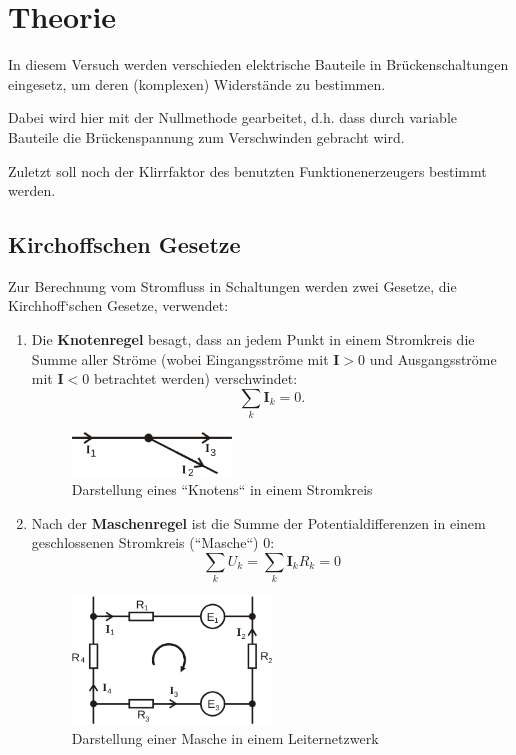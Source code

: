 \section{Theorie}
\label{sec:Theorie}

In diesem Versuch werden verschieden elektrische Bauteile in Brückenschaltungen
eingesetz, um deren (komplexen) Widerstände zu bestimmen.

Dabei wird hier mit der Nullmethode gearbeitet, d.h. dass durch variable Bauteile
die Brückenspannung zum Verschwinden gebracht wird.

Zuletzt soll noch der Klirrfaktor des benutzten Funktionenerzeugers bestimmt werden.

\subsection{Kirchoffschen Gesetze}
\label{sec:kirchhoff}
Zur Berechnung vom Stromfluss in Schaltungen werden zwei Gesetze, die
Kirchhoff`schen Gesetze, verwendet:
\begin{enumerate}
	\item Die \textbf{Knotenregel} besagt, dass an jedem Punkt in einem Stromkreis
		die Summe aller Ströme (wobei Eingangsströme mit $\mathbf{I} > 0$ und
		Ausgangsströme mit $\mathbf{I} < 0$ betrachtet werden) verschwindet:
		\begin{equation}
			\sum_k \mathbf{I}_k = 0.
			\label{eqn:knotenregel}
		\end{equation}
		\begin{figure}[H]
			\centering
			\includegraphics[width=0.4\textwidth]{bilder/knotenregel.png}
			\caption{Darstellung eines ``Knotens`` in einem Stromkreis 
			\cite{sample} }
			\label{fig:knotenregel}
		\end{figure}
	\item Nach der \textbf{Maschenregel} ist die Summe der Potentialdifferenzen
		in einem geschlossenen Stromkreis (``Masche``) 0:
		\begin{equation}
			\sum_k U_k = \sum_k \mathbf{I}_k R_k= 0
			\label{eqn:maschenregel}
		\end{equation}
		\begin{figure}[H]
			\centering
			\includegraphics[width=0.5\textwidth]{bilder/maschenregel.png}
			\caption{Darstellung einer Masche in einem Leiternetzwerk
			\cite{sample}}
			\label{fig:maschenregel}
		\end{figure}
\end{enumerate}

